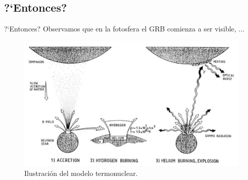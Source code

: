 \documentclass{beamer}
\begin{document}

\subsection{?`Entonces?}

\begin{frame}{?`Entonces?}
Observamos que en la fotosfera el GRB comienza a ser visible, ...

	\begin{figure}
		\centering
		\includegraphics[scale=0.2]{creacionGRB.png}
		\caption{Ilustraci\'on del modelo termonuclear.}
	\end{figure}
\end{frame}
\end{document}
